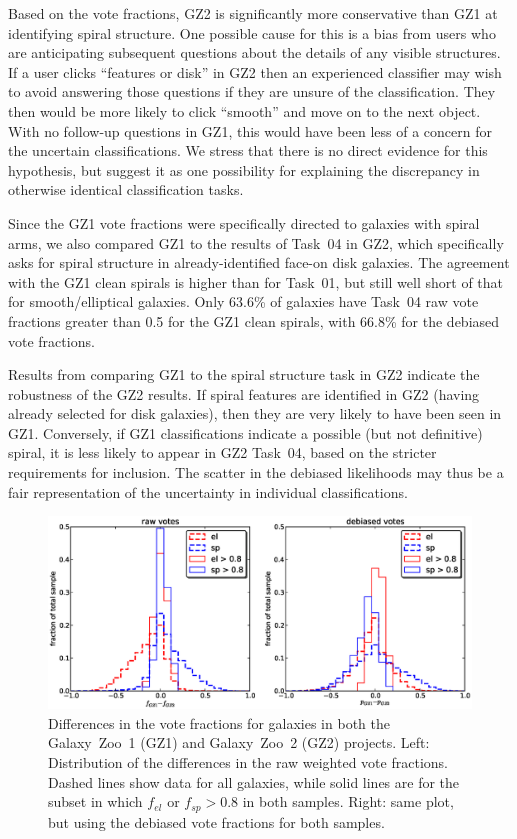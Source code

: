 \documentclass[useAMS,usenatbib]{mn2e}
\begin{document}
Based on the vote fractions, GZ2 is significantly more conservative than GZ1 at identifying spiral structure. One possible cause for this is a bias from users who are anticipating subsequent questions about the details of any visible structures. If a user clicks ``features or disk'' in GZ2 then an experienced classifier may wish to avoid answering those questions if they are unsure of the classification. They then would be more likely to click ``smooth'' and move on to the next object. With no follow-up questions in GZ1, this would have been less of a concern for the uncertain classifications. We stress that there is no direct evidence for this hypothesis, but suggest it as one possibility for explaining the discrepancy in otherwise identical classification tasks. 

Since the GZ1 vote fractions were specifically directed to galaxies with spiral arms, we also compared GZ1 to the results of Task~04 in GZ2, which specifically asks for spiral structure in already-identified face-on disk galaxies. The agreement with the GZ1 clean spirals is higher than for Task~01, but still well short of that for smooth/elliptical galaxies. Only 63.6\% of galaxies have Task~04 raw vote fractions greater than 0.5 for the GZ1 clean spirals, with 66.8\% for the debiased vote fractions. 

Results from comparing GZ1 to the spiral structure task in GZ2 indicate the robustness of the GZ2 results. If spiral features are identified in GZ2 (having already selected for disk galaxies), then they are very likely to have been seen in GZ1. Conversely, if GZ1 classifications indicate a possible (but not definitive) spiral, it is less likely to appear in GZ2 Task~04, based on the stricter requirements for inclusion. The scatter in the debiased likelihoods may thus be a fair representation of the uncertainty in individual classifications.

\begin{figure}
\includegraphics[angle=0,width=7.0in]{figures/gz1_gz2.eps}
\caption{Differences in the vote fractions for galaxies in both the Galaxy~Zoo~1 (GZ1) and Galaxy~Zoo~2 (GZ2) projects. Left: Distribution of the differences in the raw weighted vote fractions. Dashed lines show data for all galaxies, while solid lines are for the subset in which $f_{el}$ or $f_{sp} > 0.8$ in both samples. Right: same plot, but using the debiased vote fractions for both samples. 
\label{fig-gz1_gz2}}
\end{figure}
\end{document}
